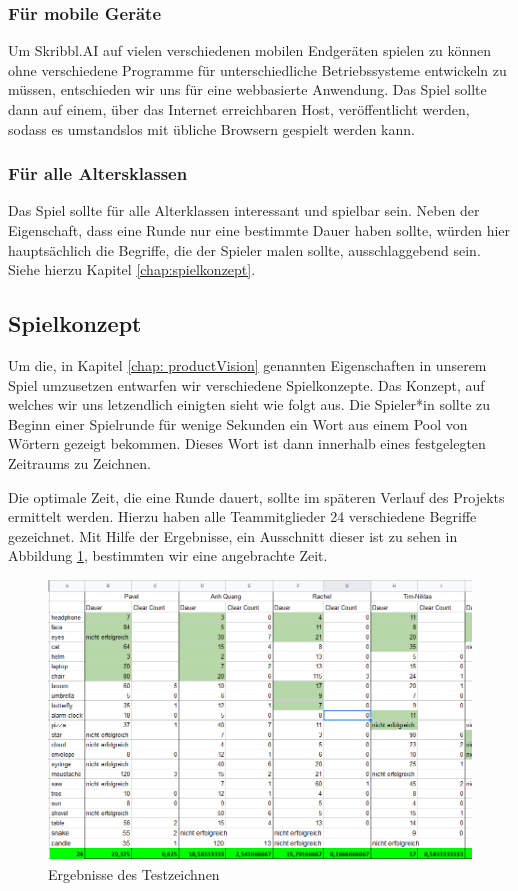 \documentclass[11pt]{article}
\begin{document}
\subsubsection{Für mobile Geräte}
Um Skribbl.AI auf vielen verschiedenen mobilen Endgeräten spielen zu können ohne verschiedene Programme für unterschiedliche Betriebssysteme entwickeln zu müssen, entschieden wir uns für eine webbasierte Anwendung. Das Spiel sollte dann auf einem, über das Internet erreichbaren Host, veröffentlicht werden, sodass es umstandslos mit übliche Browsern gespielt werden kann.
\subsubsection{Für alle Altersklassen}
Das Spiel sollte für alle Alterklassen interessant und spielbar sein. Neben der Eigenschaft, dass eine Runde nur eine bestimmte Dauer haben sollte, würden hier hauptsächlich die Begriffe, die der Spieler malen sollte, ausschlaggebend sein. Siehe hierzu Kapitel \ref{chap:spielkonzept}.
\subsection{Spielkonzept}
Um die, in Kapitel \ref{chap: productVision} genannten Eigenschaften in unserem Spiel umzusetzen entwarfen wir verschiedene Spielkonzepte. Das Konzept, auf welches wir uns letzendlich einigten sieht wie folgt aus.
Die Spieler*in sollte zu Beginn einer Spielrunde für wenige Sekunden ein Wort aus einem Pool von Wörtern gezeigt bekommen. Dieses Wort ist dann innerhalb eines festgelegten Zeitraums zu Zeichnen.

Die optimale Zeit, die eine Runde dauert, sollte im späteren Verlauf des Projekts ermittelt werden. Hierzu haben alle Teammitglieder 24 verschiedene Begriffe gezeichnet. Mit Hilfe der Ergebnisse, ein Ausschnitt dieser ist zu sehen in Abbildung \ref{fig:testResults}, bestimmten wir eine angebrachte Zeit. 

\label{chap:spielkonzept}
\begin{figure}[ht]
\centering
\includegraphics[width=1\textwidth]{images/blindtesting.png}
\caption{\label{fig:testResults}Ergebnisse des Testzeichnen}
\end{figure}
\end{document}
